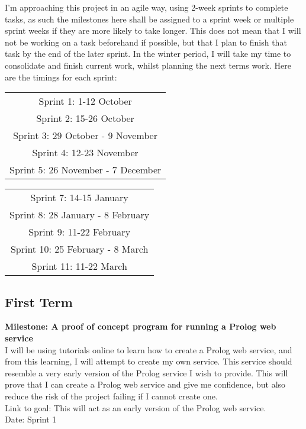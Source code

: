 \documentclass{article}
\begin{document}
I'm approaching this project in an agile way, using 2-week sprints to complete tasks, as such the milestones here shall be assigned to a sprint week or multiple sprint weeks if they are more likely to take longer. This does not mean that I will not be working on a task beforehand if possible, but that I plan to finish that task by the end of the later sprint. In the winter period, I will take my time to consolidate and finish current work, whilst planning the next terms work. Here are the timings for each sprint:
\begin{center}
	\begin{tabular}{c}
	Sprint 1: 1-12 October \\
	Sprint 2: 15-26 October\\
	Sprint 3: 29 October - 9 November\\
	Sprint 4: 12-23 November\\
	Sprint 5: 26 November - 7 December\\
	\end{tabular}
	\begin{tabular}{c}
	Sprint 7: 14-15 January\\
	Sprint 8: 28 January - 8 February\\
	Sprint 9: 11-22 February\\
	Sprint 10: 25 February - 8 March\\
	Sprint 11: 11-22 March\\
	\end{tabular}
\end{center}

\subsection*{First Term}

\noindent\textbf{Milestone: A proof of concept program for running a Prolog web service}\\
I will be using tutorials online to learn how to create a Prolog web service, and from this learning, I will attempt to create my own service. This service should resemble a very early version of the Prolog service I wish to provide. This will prove that I can create a Prolog web service and give me confidence, but also reduce the risk of the project failing if I cannot create one.\\
Link to goal: This will act as an early version of the Prolog web service.\\
Date: Sprint 1\\
\end{document}

